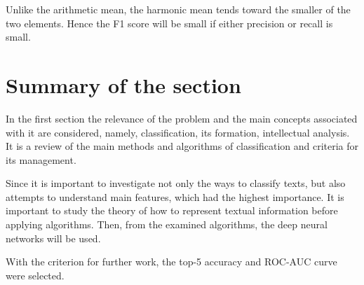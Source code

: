 Unlike the arithmetic mean, the harmonic mean tends toward the smaller of the two elements. Hence the F1 score will be small if either precision or recall is small.

\section{Summary of the section}

In the first section the relevance of the problem and the main concepts associated with it are considered, namely, classification, its formation, intellectual analysis. It is a review of the main methods and algorithms of classification and criteria for its management.

Since it is important to investigate not only the ways to classify texts, but also attempts to understand main features, which had the highest importance. It is important to study the theory of how to represent textual information before applying algorithms. Then, from the examined algorithms, the deep neural networks will be used. 

With the criterion for further work, the top-5 accuracy and ROC-AUC curve were selected.
